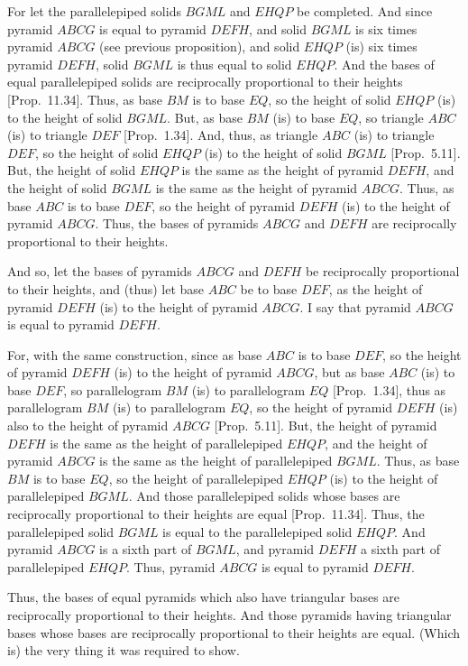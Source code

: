 \begin{Parallel}{}{}
{For let the parallelepiped solids $BGML$ and $EHQP$ be completed. And since pyramid
$ABCG$ is equal to pyramid $DEFH$, and solid $BGML$ is six times pyramid $ABCG$ (see previous
proposition), and solid $EHQP$ (is) six times pyramid $DEFH$, solid $BGML$ is thus equal to
solid $EHQP$. And the bases of equal parallelepiped solids are reciprocally proportional
to their heights [Prop.~11.34]. Thus, as base $BM$ is to base $EQ$, so the height of
solid $EHQP$ (is) to the height of solid $BGML$. But, as base $BM$ (is) to base $EQ$, so triangle
$ABC$ (is) to triangle $DEF$ [Prop.~1.34]. And, thus, as triangle $ABC$ (is) to triangle
$DEF$, so the height of solid $EHQP$ (is) to the height of solid $BGML$ [Prop.~5.11]. But, the height of
solid $EHQP$ is the same as the height of pyramid $DEFH$, and the height of solid $BGML$ is the
same as the height of pyramid $ABCG$. Thus, as base $ABC$ is to base $DEF$, so the
height of pyramid $DEFH$ (is) to the height of pyramid $ABCG$. Thus, the bases of pyramids
$ABCG$ and $DEFH$ are reciprocally proportional to their heights.

And so, let the bases of pyramids $ABCG$ and $DEFH$ be reciprocally proportional to their heights, and (thus) let
base $ABC$ be to base $DEF$, as the height of pyramid $DEFH$ (is) to the height of pyramid $ABCG$.
I say that pyramid $ABCG$ is equal to pyramid $DEFH$.

For, with the same construction, since as base $ABC$ is to base $DEF$, so the height of pyramid $DEFH$ (is)
to the height of pyramid $ABCG$, but as base $ABC$ (is) to base $DEF$, so parallelogram $BM$ (is)
to parallelogram $EQ$ [Prop.~1.34], thus as parallelogram $BM$ (is) to
parallelogram $EQ$, so the height of pyramid $DEFH$  (is) also to the height of pyramid $ABCG$ [Prop.~5.11]. But, 
the height of pyramid $DEFH$ is the same as the height of parallelepiped $EHQP$, and the height of
pyramid $ABCG$ is the same as the height of parallelepiped $BGML$. Thus, as base $BM$ is to
base $EQ$, so the height of parallelepiped $EHQP$ (is) to the height of parallelepiped $BGML$.
And those parallelepiped solids whose bases are reciprocally proportional to their
heights are equal [Prop.~11.34]. Thus, the parallelepiped solid $BGML$ is equal to the parallelepiped
solid $EHQP$. And pyramid $ABCG$ is a sixth part of $BGML$, and pyramid $DEFH$ a sixth part of
parallelepiped $EHQP$. Thus, pyramid $ABCG$ is equal to pyramid $DEFH$.

Thus,  the bases of equal pyramids which also have triangular bases are reciprocally
proportional to their heights. And those pyramids having triangular bases whose bases are reciprocally
proportional to their heights  are equal. (Which is) the very thing it was required to show.}
\end{Parallel}

